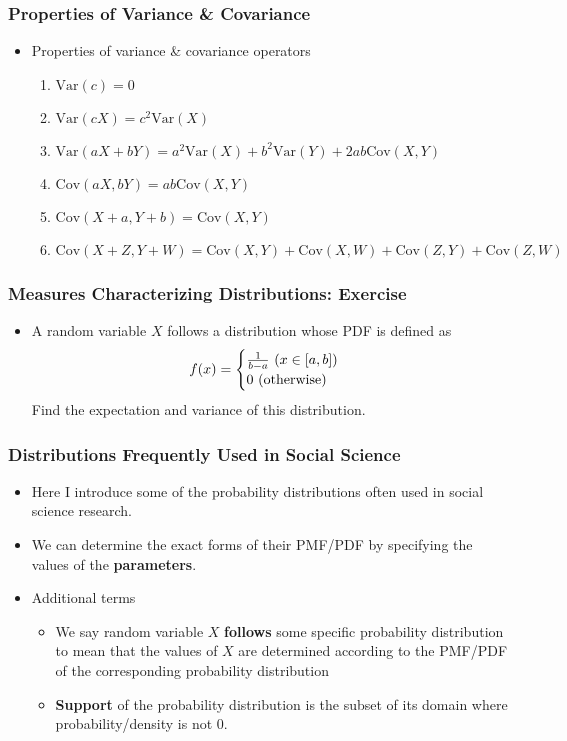 \documentclass[pdflatex, 12pt]{beamer}
\begin{document}
\begin{frame}
\frametitle{Properties of Variance \& Covariance}
\begin{itemize}
\item Properties of variance \& covariance operators
 \begin{enumerate}
 \item $\mathrm{Var}(c) = 0$
 \item $\mathrm{Var}(cX) = c^2\mathrm{Var}(X)$
 \item $\mathrm{Var}(aX + bY) = a^2\mathrm{Var}(X) + b^2\mathrm{Var}(Y) + 2ab\mathrm{Cov}(X, Y)$
 \item $\mathrm{Cov}(aX, bY) = ab\mathrm{Cov}(X, Y)$
 \item $\mathrm{Cov}(X + a, Y + b) = \mathrm{Cov}(X, Y)$
 \item $\mathrm{Cov}(X + Z, Y + W) = \mathrm{Cov}(X, Y) + \mathrm{Cov}(X, W) + \mathrm{Cov}(Z, Y) + \mathrm{Cov}(Z, W)$
 \end{enumerate}
\end{itemize}
\end{frame}

\begin{frame}
\frametitle{Measures Characterizing Distributions: Exercise}
\begin{itemize}
\item A random variable $X$ follows a distribution whose PDF is defined as
 \begin{equation}
 f(x) = 
 \begin{cases}
 \frac{1}{b- a} \ (x \in [a, b]) \\
 0 \ (\mathrm{otherwise})
 \end{cases} \notag
 \end{equation}
Find the expectation and variance of this distribution.
\end{itemize}
\end{frame}

\begin{frame}
\frametitle{Distributions Frequently Used in Social Science}
\begin{itemize}
\item Here I introduce some of the probability distributions often used in social science research.
\vspace{0.4cm}
\item We can determine the exact forms of their PMF/PDF by specifying the values of the \textbf{parameters}.
\vspace{0.4cm}
\item Additional terms
 \begin{itemize}
 \item We say random variable $X$ \textbf{follows} some specific probability distribution to mean that the values of $X$ are determined according to the PMF/PDF of the corresponding probability distribution
 \item \textbf{Support} of the probability distribution is the subset of its domain where probability/density is not 0. 
 \end{itemize} 
\end{itemize}
\end{frame}
\end{document}
